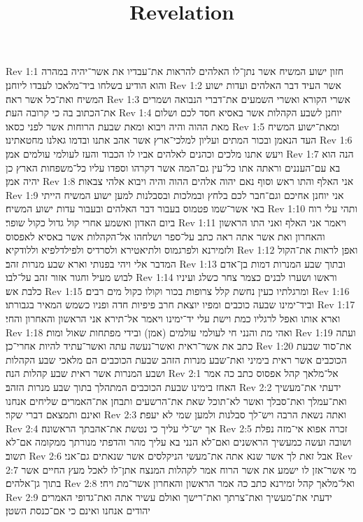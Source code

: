 

\title{Revelation}

Rev 1:1  חזון ישוע המשיח אשר נתן־לו האלהים להראות את־עבדיו את אשר־יהיה במהרה והוא הודיע בשלחו ביד־מלאכו לעבדו ליוחנן׃
Rev 1:2  אשר העיד דבר האלהים ועדות ישוע המשיח ואת־כל אשר ראה׃
Rev 1:3  אשרי הקורא ואשרי השמעים את־דברי הנבואה ושמרים את־הכתוב בה כי קרובה העת׃
Rev 1:4  יוחנן לשבע הקהלות אשר באסיא חסד לכם ושלום מאת ההוה והיה ויבוא ומאת שבעת הרוחות אשר לפני כסאו׃
Rev 1:5  ומאת־ישוע המשיח העד הנאמן ובכור המתים ועליון למלכי־ארץ אשר אהב אתנו ובדמו גאלנו מחטאתינו׃
Rev 1:6  ויעש אתנו מלכים וכהנים לאלהים אביו לו הכבוד והעז לעולמי עולמים אמן׃
Rev 1:7  הנה הוא בא עם־העננים וראתה אתו כל־עין גם־המה אשר דקרהו וספדו עליו כל־משפחות הארץ כן יהיה אמן׃
Rev 1:8  אני האלף והתו ראש וסוף נאם יהוה אלהים ההוה והיה ויבוא אלהי צבאות׃
Rev 1:9  אני יוחנן אחיכם וגם־חבר לכם בלחץ ובמלכות ובסבלנות למען ישוע המשיח הייתי באי אשר־שמו פטמוס בעבור דבר האלהים ובעבור עדות ישוע המשיח׃
Rev 1:10  ותהי עלי רוח ביום האדון ואשמע אחרי קול גדול כקול שופר׃
Rev 1:11  ויאמר אני האלף ואני התו הראשון והאחרון ואת אשר אתה ראה כתב על־ספר ושלחהו אל־הקהלות אשר באסיא לאפסוס ולזמירנא ולפרגמוס ולתיאטירא ולסרדיס ולפילדלפיא וללודקיא׃
Rev 1:12  ואפן לראות את־הקול המדבר אלי ויהי בפנותי וארא שבע מנרות זהב׃
Rev 1:13  ובתוך שבע המנרות דמות בן־אדם לבוש מעיל וחגור אזור זהב על־לבו׃
Rev 1:14  וראשו ושערו לבנים כצמר צחר כשלג ועיניו כלבת אש׃
Rev 1:15  ומרגלתיו כעין נחשת קלל צרופות בכור וקולו כקול מים רבים׃
Rev 1:16  וביד־ימינו שבעה כוכבים ומפיו יוצאת חרב פיפיות חדה ופניו כשמש המאיר בגבורתו׃
Rev 1:17  וארא אותו ואפל לרגליו כמת וישת עלי יד־ימינו ויאמר אל־תירא אני הראשון והאחרון והחי׃
Rev 1:18  ואהי מת והנני חי לעולמי עולמים (אמן) ובידי מפתחות שאול ומות׃
Rev 1:19  ועתה כתב את אשר־ראית ואשר־נעשה עתה ואשר־עתיד להיות אחרי־כן׃
Rev 1:20  את־סוד שבעת הכוכבים אשר ראית בימיני ואת־שבע מנרות הזהב שבעת הכוכבים הם מלאכי שבע הקהלות ושבע המנרות אשר ראית שבע קהלות הנה׃
Rev 2:1  אל־מלאך קהל אפסוס כתב כה אמר האחז בימינו שבעת הכוכבים המתהלך בתוך שבע מנרות הזהב׃
Rev 2:2  ידעתי את־מעשיך ואת־עמלך ואת־סבלך ואשר לא־תוכל שאת את־הרשעים ותבחן את־האמרים שליחים אנחנו ואינם ותמצאם דברי שקר׃
Rev 2:3  ואתה נשאת הרבה ויש־לך סבלנות ולמען שמי לא יעפת׃
Rev 2:4  אך יש־לי עליך כי נטשת את־אהבתך הראשונה׃
Rev 2:5  זכרה אפוא אי־מזה נפלת ושובה ועשה כמעשיך הראשנים ואם־לא הנני בא עליך מהר והדפתי מנורתך ממקומה אם־לא תשוב׃
Rev 2:6  אבל זאת לך אשר שנא אתה את־מעשי הניקלסים אשר שנאתים גם־אני׃
Rev 2:7  מי אשר־אזן לו ישמע את אשר הרוח אמר לקהלות המנצח אתן־לו לאכל מעץ החיים אשר בתוך גן־אלהים׃
Rev 2:8  ואל־מלאך קהל זמירנא כתב כה אמר הראשון והאחרון אשר־מת ויחי׃
Rev 2:9  ידעתי את־מעשיך ואת־צרתך ואת־רישך ואולם עשיר אתה ואת־גדופי האמרים יהודים אנחנו ואינם כי אם־כנסת השטן׃
